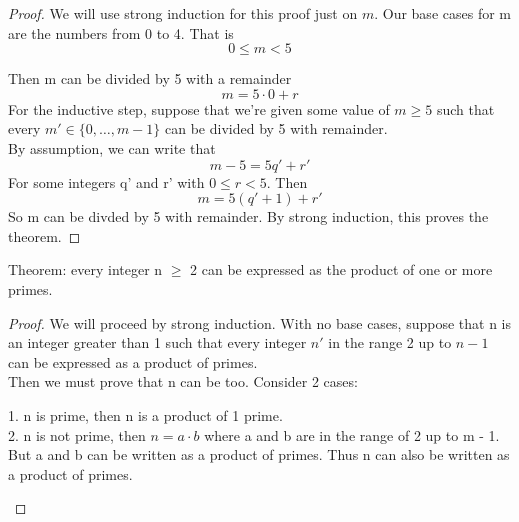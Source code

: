 \documentclass{article}
\begin{document}
\begin{proof}
    We will use strong induction for this proof just on $m$. Our base cases for m are the numbers from 0 to 4. That is 
    \begin{equation}
        0 \leq m < 5
    \end{equation}

    Then m can be divided by 5 with a remainder
    \begin{equation}
        m = 5 \cdot 0 + r
    \end{equation}
    For the inductive step, suppose that we're given some value of $m \geq 5$ such that every $m' \in \{0, \dots, m-1\}$ can be divided by 5 with remainder. \\
    By assumption, we can write that 
    \begin{equation}
        m-5 = 5q' + r' 
    \end{equation}
    For some integers q' and r' with $0\leq r <5$. Then 
    \begin{equation}
        m = 5(q'+1) + r'
    \end{equation}
    So m can be divded by 5 with remainder. By strong induction, this proves the theorem. 
\end{proof}

Theorem: every integer n $\geq$ 2 can be expressed as the product of one or more primes. 

\begin{proof}
    We will proceed by strong induction. With no base cases, suppose that n is an integer greater than 1 such that every integer $n'$ in the range 2 up to $n-1$ can be expressed as a product of primes.\\
    Then we must prove that n can be too. Consider 2 cases: \\
    \begin{center}
        1. n is prime, then n is a product of 1 prime.\\
        2. n is not prime, then $n = a \cdot b$ where a and b are in the range of 2 up to m - 1. But a and b can be written as a product of primes. Thus n can also be written as a product of primes. 
    \end{center} 
\end{proof}
\end{document}
